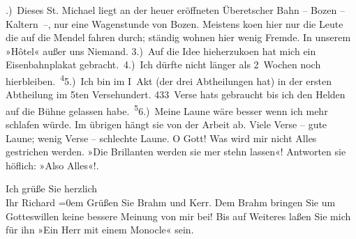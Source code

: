 .) Dieses St. Michael liegt an der heuer
               eröffneten Überetscher Bahn – Bozen – Kaltern –, nur
               eine Wagenstunde von Bozen. Meistens ko{\geminationm}en hier nur die Leute die auf die Mendel fahren durch; ständig wohnen hier wenig Fremde. In
               unserem »Hôtel« außer uns Niemand. 3.) Auf die
               Idee hieherzuko{\geminationm}en hat mich ein Eisenbahnplakat
               gebracht. 4.) Ich dürfte nicht länger als 2 Wochen noch hierbleiben. \substVorne{}\textsuperscript{4}\substDazwischen{}5\substHinten{}.) Ich bin im I Akt
               (der drei Abtheilungen hat) in der ersten Abtheilung im 5ten Versehundert. 433 Verse hats gebraucht bis
               ich den Helden auf die Bühne gelassen habe. \substVorne{}\textsuperscript{5}\substDazwischen{}6\substHinten{}.) Meine Laune wäre besser {\pb}wenn ich mehr schlafen würde. Im übrigen hängt sie von der Arbeit ab. Viele Verse –
               gute Laune; wenig Verse – schlechte Laune. O Gott! Was wird mir nicht Alles
               gestrichen werden. »Die Brillanten werden sie mer stehn lassen«! Antworten sie
               höflich: »Also Alles«!.\pend
           
\pstart
           Ich grüße Sie herzlich{\\[\baselineskip]}Ihr \spacefill\mbox{Richard}\pend
           \leftskip=0em{}
\pstart
           \noindent{}Grüßen Sie Brahm und Kerr. Dem Brahm bringen Sie um Gotteswillen keine
                  bessere Meinung von mir bei! Bis auf Weiteres laßen Sie mich für ihn »Ein Herr mit
                  einem Monocle« sein.\pend
           \endnumbering{}  \newcommand{\dateiname}{L00988}\newcommand{\titel}{Richard Beer-Hofmann an Arthur Schnitzler, 3. 10. 1899}\newcommand{\editorInnen}{Martin Anton Müller und Gerd-Hermann Susen}
